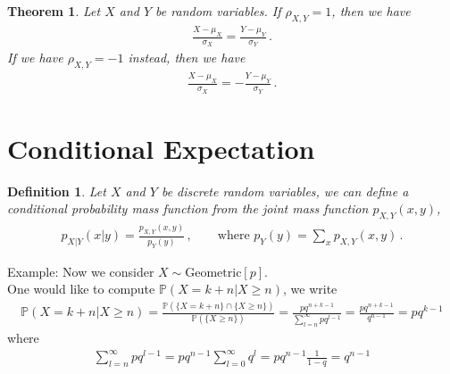 \documentclass[11pt, onesided]{book}
\theoremstyle{break}
\theoremstyle{break}
\newtheorem{thm}{Theorem}[section]
\newtheorem{defn}{Definition}[thm]
\newcommand{\example}{\color{green}Example: \color{black}}
\begin{document}
\begin{thm}
Let $X$ and $Y$ be random variables. If $\rho_{X,Y} = 1$, then we have
\begin{align*}
\frac{X - \mu_X}{\sigma_X} = \frac{Y-\mu_Y}{\sigma_Y}\,.
\end{align*}
If we have $\rho_{X,Y} = -1$ instead, then we have
\begin{align*}
\frac{X-\mu_X}{\sigma_X} = -\frac{Y-\mu_Y}{\sigma_Y}\,.
\end{align*}
\end{thm}

\newpage
\section[Conditional Expectation]{\color{red} Conditional Expectation \color{black}}
\begin{defn}
Let $X$ and $Y$ be discrete random variables, we can define a conditional probability mass function from the joint mass function $p_{X,Y}(x,y)$,
\begin{align*}
p_{X|Y}(x|y) = \frac{p_{X,Y}(x,y)}{p_Y(y)}\,, \qquad\text{where }p_Y(y) = \sum_{x} p_{X,Y}(x,y)\,.
\end{align*}
\end{defn} 
\example Now we consider $X\sim\text{Geometric}[p]$. \\
One would like to compute $\mathbb{P}(X=k+n | X\geq n)$, we write
\begin{align*}
\mathbb{P}(X=k+n | X\geq n) = \frac{\mathbb{P}(\{X = k+n\}\cap \{X\geq n\})}{\mathbb{P}(\{X\geq n\})} = \frac{pq^{n+k-1}}{\sum_{l=n}^\infty pq^{l-1}} = \frac{pq^{n+k-1}}{q^{n-1}} =p q^{k-1}
\end{align*}
where 
\begin{align*}
\sum_{l=n}^\infty pq^{l-1} = pq^{n-1} \sum_{l=0}^\infty q^l = pq^{n-1} \frac{1}{1-q} = q^{n-1}
\end{align*}
\end{document}
